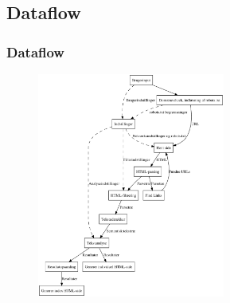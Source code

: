 \documentclass{beamer}
\begin{document}
\subsection{Dataflow}
\begin{frame}
  \frametitle{Dataflow}
  \begin{figure}
    \includegraphics[width=0.55\textwidth]{endeligtdesignill.pdf}
  \end{figure}
\end{frame}
\end{document}
